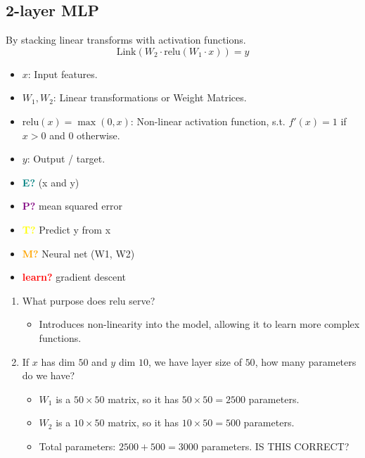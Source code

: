 \subsection{2-layer MLP}
\begin{definition} By stacking linear transforms with activation functions.
    \begin{equation}
        \text{Link}(W_2 \cdot \text{relu}(W_1 \cdot x)) = y
    \end{equation}
    \begin{itemize}
        \item $x$: Input features.
        \item $W_1, W_2$: Linear transformations or Weight Matrices.
        \item $\text{relu}(x) = \max(0,x)$: Non-linear activation function, s.t. $f'(x) = 1$ if $x > 0$ and $0$ otherwise.
        \item $y$: Output / target. 
    \end{itemize}
    \vspace{1em}

    \begin{itemize}
        \item \textcolor{teal}{\textbf{E?}} (x and y)
        \item \textcolor{purple}{\textbf{P?}} mean squared error
        \item \textcolor{yellow}{\textbf{T?}} Predict y from x
        \item \textcolor{orange}{\textbf{M?}} Neural net (W1, W2)
        \item \textcolor{red}{\textbf{learn?}} gradient descent
    \end{itemize}
\end{definition}

\begin{example}
    \begin{enumerate}
        \item What purpose does relu serve? 
            \begin{itemize}
                \item Introduces non-linearity into the model, allowing it to learn more complex functions.
            \end{itemize}       
        \item If $x$ has dim $50$ and $y$ dim $10$, we have layer size of $50$, how many parameters do we have?
            \begin{itemize}
                \item $W_1$ is a $50 \times 50$ matrix, so it has $50 \times 50 = 2500$ parameters.
                \item $W_2$ is a $10 \times 50$ matrix, so it has $10 \times 50 = 500$ parameters.
                \item Total parameters: $2500 + 500 = 3000$ parameters. IS THIS CORRECT?
            \end{itemize} 
    \end{enumerate}
\end{example}

